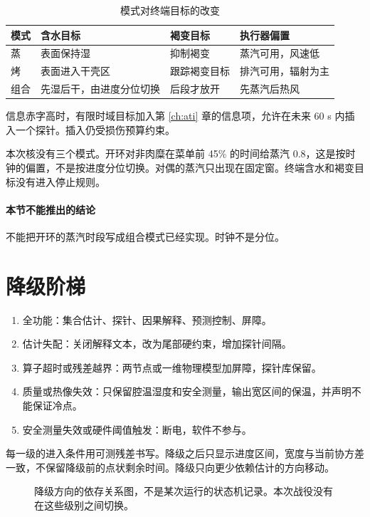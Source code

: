 \begin{table}[ht]
\centering
\caption{模式对终端目标的改变}
\begin{tabularx}{\textwidth}{lXXX}
\toprule
模式 & 含水目标 & 褐变目标 & 执行器偏置 \\
\midrule
蒸 & 表面保持湿 & 抑制褐变 & 蒸汽可用，风速低 \\
烤 & 表面进入干壳区 & 跟踪褐变目标 & 排汽可用，辐射为主 \\
组合 & 先湿后干，由进度分位切换 & 后段才放开 & 先蒸汽后热风 \\
\bottomrule
\end{tabularx}
\end{table}

信息赤字高时，有限时域目标加入第 \ref{ch:ati} 章的信息项，允许在未来 60 s 内插入一个探针。插入仍受损伤预算约束。

本次核没有三个模式。开环对非肉糜在菜单前 45\% 的时间给蒸汽 0.8，这是按时钟的偏置，不是按进度分位切换。对偶的蒸汽只出现在固定窗。终端含水和褐变目标没有进入停止规则。

\paragraph{本节不能推出的结论}
不能把开环的蒸汽时段写成组合模式已经实现。时钟不是分位。

\section{降级阶梯}

\begin{enumerate}
\item 全功能：集合估计、探针、因果解释、预测控制、屏障。
\item 估计失配：关闭解释文本，改为尾部硬约束，增加探针间隔。
\item 算子超时或残差越界：两节点或一维物理模型加屏障，探针库保留。
\item 质量或热像失效：只保留腔温湿度和安全测量，输出宽区间的保温，并声明不能保证冷点。
\item 安全测量失效或硬件阈值触发：断电，软件不参与。
\end{enumerate}

每一级的进入条件用可测残差书写。降级之后只显示进度区间，宽度与当前协方差一致，不保留降级前的点状剩余时间。降级只向更少依赖估计的方向移动。

\begin{figure}[ht]
\centering
{}
\caption{降级方向的依存关系图，不是某次运行的状态机记录。本次战役没有在这些级别之间切换。}
\end{figure}

